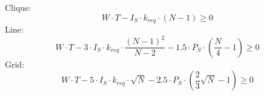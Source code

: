 \vspace{3mm}
\noindent
Clique:
\begin{equation}
\label{eq:clique_gen}
	W \cdot T - I_S \cdot k_{req} \cdot (N-1) \geq 0
\end{equation}
Line:
\begin{equation}
\label{eq:line_gen}
	W \cdot T - 3 \cdot I_S \cdot k_{req} \cdot \frac{(N-1)^2}{N-2} - 1.5 \cdot P_S \cdot (\frac{N}{4}-1) \geq 0
\end{equation}
Grid:
\begin{equation}
\label{eq:grid_gen}
	W \cdot T - 5 \cdot I_S \cdot k_{req} \cdot \sqrt{N} - 2.5 \cdot P_S \cdot (\frac{2}{3}\sqrt{N} - 1) \geq 0
\end{equation}


